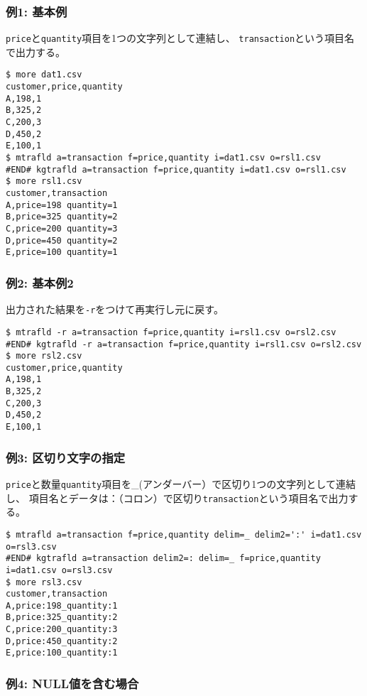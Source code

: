 \subsubsection*{例1: 基本例}

\verb|price|と\verb|quantity|項目を1つの文字列として連結し、
\verb|transaction|という項目名で出力する。


\begin{Verbatim}[baselinestretch=0.7,frame=single]
$ more dat1.csv
customer,price,quantity
A,198,1
B,325,2
C,200,3
D,450,2
E,100,1
$ mtrafld a=transaction f=price,quantity i=dat1.csv o=rsl1.csv
#END# kgtrafld a=transaction f=price,quantity i=dat1.csv o=rsl1.csv
$ more rsl1.csv
customer,transaction
A,price=198 quantity=1
B,price=325 quantity=2
C,price=200 quantity=3
D,price=450 quantity=2
E,price=100 quantity=1
\end{Verbatim}
\subsubsection*{例2: 基本例2}

出力された結果を\verb|-r|をつけて再実行し元に戻す。


\begin{Verbatim}[baselinestretch=0.7,frame=single]
$ mtrafld -r a=transaction f=price,quantity i=rsl1.csv o=rsl2.csv
#END# kgtrafld -r a=transaction f=price,quantity i=rsl1.csv o=rsl2.csv
$ more rsl2.csv
customer,price,quantity
A,198,1
B,325,2
C,200,3
D,450,2
E,100,1
\end{Verbatim}
\subsubsection*{例3: 区切り文字の指定}

\verb|price|と数量\verb|quantity|項目を\_(アンダーバー）で区切り1つの文字列として連結し、
項目名とデータは：（コロン）で区切り\verb|transaction|という項目名で出力する。


\begin{Verbatim}[baselinestretch=0.7,frame=single]
$ mtrafld a=transaction f=price,quantity delim=_ delim2=':' i=dat1.csv o=rsl3.csv
#END# kgtrafld a=transaction delim2=: delim=_ f=price,quantity i=dat1.csv o=rsl3.csv
$ more rsl3.csv
customer,transaction
A,price:198_quantity:1
B,price:325_quantity:2
C,price:200_quantity:3
D,price:450_quantity:2
E,price:100_quantity:1
\end{Verbatim}
\subsubsection*{例4: NULL値を含む場合}



